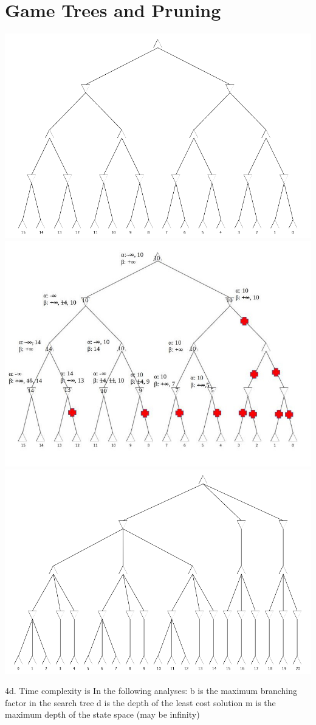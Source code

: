 \documentclass[11pt, english]{article}
\begin{document}
\section{Game Trees and Pruning}
\includegraphics[width=1\textwidth]{minimax-tree.png}
\includegraphics[width=1\textwidth]{pruned-tree-process.jpg}
\includegraphics[width=1\textwidth]{pruned-tree-final.png}

4d.
Time complexity is
In the following analyses: 
b is the maximum branching factor in the search tree 
d is the depth of the least cost solution 
m is the maximum depth of the state space (may be infinity) 
\end{document}
